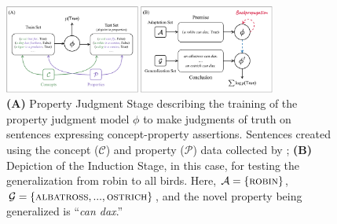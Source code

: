 \documentclass[10pt,letterpaper]{article}
\newcommand{\km}[1]{\textcolor{purple}{$_{KM}$[#1]}}
\newcommand{\adaptation}{\mathcal{A}}
\newcommand{\generalization}{\mathcal{G}}
\newcommand{\concepts}{\mathcal{C}}
\newcommand{\properties}{\mathcal{P}}
\begin{document}
\begin{figure}[t!]
    \centering
    \includegraphics[width=0.8\textwidth]{inductionframeworkcogsci.pdf}
    \caption{\textbf{(A)} Property Judgment Stage describing the training of the property judgment model $\phi$ to make judgments of truth on sentences expressing concept-property assertions. Sentences created using the concept ($\concepts$) and property ($\properties$) data collected by \citet{devereux2014centre}; \textbf{(B)} Depiction of the Induction Stage, in this case, for testing the generalization from robin to all birds. Here, $\adaptation = \{\textsc{robin}\}$, $\generalization = \{\textsc{albatross}, ..., \textsc{ostrich}\}$, and the novel property being generalized is ``\textit{can dax}.''}
    \label{fig:framework}
\end{figure}
\end{document}

